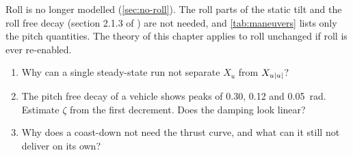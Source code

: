 \begin{revised}[title=Revised 15 October 2026]
Roll is no longer modelled (\cref{sec:no-roll}). The roll parts of the static tilt and the roll
free decay (section 2.1.3 of ) are not needed, and \cref{tab:maneuvers} lists
only the pitch quantities. The theory of this chapter applies to roll unchanged if roll is
ever re-enabled.
\end{revised}

\begin{questions}
\begin{enumerate}
  \item Why can a single steady-state run not separate $X_u$ from $X_{u|u|}$?
  \item The pitch free decay of a vehicle shows peaks of \num{0.30}, \num{0.12} and
        \qty{0.05}{\radian}. Estimate $\zeta$ from the first decrement. Does the damping look linear?
  \item Why does a coast-down not need the thrust curve, and what can it still not deliver on its own?
\end{enumerate}
\end{questions}
